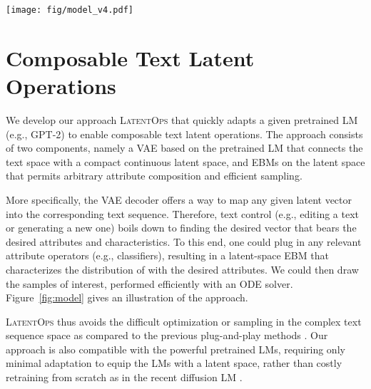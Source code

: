 \documentclass[11pt]{article}
\begin{document}
 \begin{figure*}
    \centering
    \vspace{-15pt}
    \texttt{[image: fig/model\_v4.pdf]}
\caption{Overview of \textsc{LatentOps}. 
    (Left): We equip pretrained LMs (e.g., GPT-2) with the compact continuous latent space through parameter-efficient adaptation (\S\ref{sec:vae_training}).
    (Right): One could plug in arbitrary operators (e.g., attribute classifiers) to obtain the latent-space EBM (\S\ref{sec:latent_ebms}). We then sample desired latent vectors efficiently by solving the ODE which works backwards through the diffusion process from time  to . The resulting sample  is fed to the decoder (adapted GPT-2) to generate the desired text sequence.
    }
    \label{fig:model}
    \vspace{-10pt}
\end{figure*}

\section{Composable Text Latent Operations} 
We develop our approach \textsc{LatentOps} that quickly adapts a given pretrained LM (e.g., GPT-2) to enable composable text latent operations. The approach consists of two components, namely a VAE based on the pretrained LM that connects the text space with a compact continuous latent space, and EBMs on the latent space that permits arbitrary attribute composition and efficient sampling. 

More specifically, the VAE decoder  offers a way to map any given latent vector  into the corresponding text sequence. Therefore, text control (e.g., editing a text or generating a new one) boils down to finding the desired vector  that bears the desired attributes and characteristics. To this end, one could plug in any relevant attribute operators (e.g., classifiers), resulting in a latent-space EBM that characterizes the distribution of  with the desired attributes. We could then draw the  samples of interest, performed efficiently with an ODE solver. Figure~\ref{fig:model} gives an illustration of the approach.

\textsc{LatentOps} thus avoids the difficult optimization or sampling in the complex text sequence space as compared to the previous plug-and-play methods \cite[e.g.,][]{DBLP:journals/corr/abs-2104-05218,Dathathri2020Plug,QinCOLD}. Our approach is also compatible with the powerful pretrained LMs, requiring only minimal adaptation to equip the LMs with a latent space, rather than costly retraining from scratch as in the recent diffusion LM \cite{li2022diffusion}. 
\end{document}
